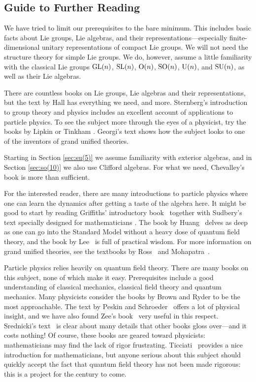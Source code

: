 \documentclass{article}
\renewcommand{\O}{{\rm O}}    %
\newcommand{\U}{{\rm U}}    %
\newcommand{\SO}{{\rm SO}}    %
\newcommand{\SU}{{\rm SU}}    %
\newcommand{\GL}{{\rm{GL}}}  %
\newcommand{\SL}{{\rm{SL}}}  %
\begin{document}
\subsection{Guide to Further Reading} \label{subsec:reading}

We have tried to limit our prerequisites to the bare
minimum.  This includes basic facts about Lie groups, Lie
algebras, and their representations---especially finite-dimensional 
unitary representations of compact Lie groups.  We will not need 
the structure theory for simple Lie groups.  We do, however, 
assume a little familiarity with the classical Lie groups 
$\GL(n)$, $\SL(n)$, $\O(n)$, $\SO(n)$, $\U(n)$, and $\SU(n)$, 
as well as their Lie algebras.

There are countless books on Lie groups, Lie algebras and their 
representations, but the text by Hall \cite{hall} has everything we 
need, and more.  Sternberg's introduction to group theory and physics
\cite{sternberg} includes an excellent account of applications 
to particle physics.  To see the subject more through the eyes
of a physicist, try the books by Lipkin \cite{lipkin} or 
Tinkham \cite{tinkham}.  Georgi's text \cite{georgi:lie} shows 
how the subject looks to one of the inventors of grand unified theories. 

Starting in Section \ref{sec:su(5)} we assume familiarity
with exterior algebras, and in Section \ref{sec:so(10)} we
also use Clifford algebras.  For what we need, 
Chevalley's book \cite{Chevalley} is more than sufficient.

For the interested reader, there are many introductions to particle physics
where one can learn the dynamics after getting a taste of the algebra here.  
It might be good to start by reading Griffiths' introductory
book~\cite{griffiths:intro} together with Sudbery's text specially designed for
mathematicians \cite{sudbery}.  The book by Huang~\cite{huang:qlgf} delves as
deep as one can go into the Standard Model without a heavy dose of quantum
field theory, and the book by Lee~\cite{lee:pp} is full of practical wisdom.
For more information on grand unified theories, see the textbooks by
Ross~\cite{ross:gut} and Mohapatra~\cite{mohapatra:us}.

Particle physics relies heavily on quantum field theory. 
There are many books on this subject, none of which make it easy.
Prerequisites include a good understanding of classical mechanics, 
classical field theory and quantum mechanics.  Many physicists 
consider the books by Brown \cite{Brown} and Ryder \cite{Ryder} to 
be the most approachable.  The text by Peskin and 
Schroeder~\cite{PeskinSchroeder:qft} offers a lot of physical insight, 
and we have also found Zee's book~\cite{zee:nutshell} 
very useful in this respect.  Srednicki's text~\cite{srednicki:qft} is clear 
about many details that other books gloss over---and it costs nothing!  Of 
course, these books are geared toward physicists: mathematicians may
find the lack of rigor frustrating.  Ticciati~\cite{ticciati:qft}
provides a nice introduction for mathematicians, but anyone serious
about this subject should quickly accept the fact that quantum field 
theory has not been made rigorous: this is a project for the century to come.
\end{document}

